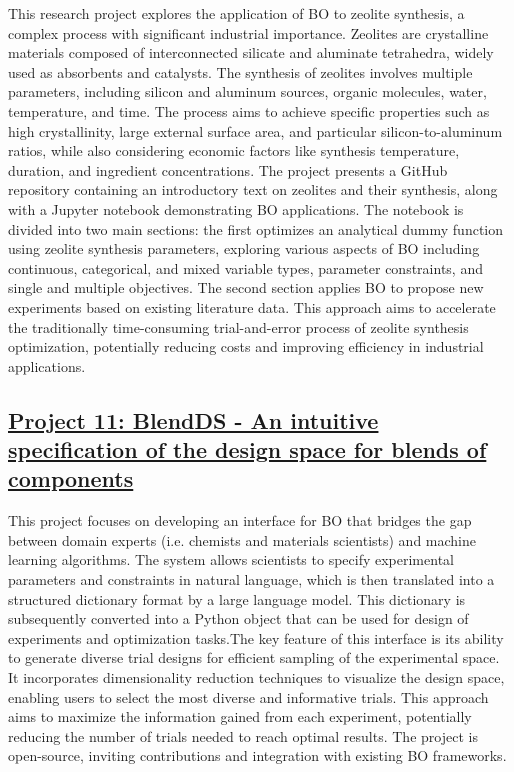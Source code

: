 This research project explores the application of BO to zeolite synthesis, a complex process with significant industrial importance. Zeolites are crystalline materials composed of interconnected silicate and aluminate tetrahedra, widely used as absorbents and catalysts\cite{dusselier2018small}. The synthesis of zeolites involves multiple parameters, including silicon and aluminum sources, organic molecules, water, temperature, and time. The process aims to achieve specific properties such as high crystallinity, large external surface area, and particular silicon-to-aluminum ratios, while also considering economic factors like synthesis temperature, duration, and ingredient concentrations\cite{mallette2024current}. The project presents a GitHub repository containing an introductory text on zeolites and their synthesis, along with a Jupyter notebook demonstrating BO applications. The notebook is divided into two main sections: the first optimizes an analytical dummy function using zeolite synthesis parameters, exploring various aspects of BO including continuous, categorical, and mixed variable types, parameter constraints, and single and multiple objectives. The second section applies BO to propose new experiments based on existing literature data. This approach aims to accelerate the traditionally time-consuming trial-and-error process of zeolite synthesis optimization, potentially reducing costs and improving efficiency in industrial applications.
 \subsection*{\href{https://www.youtube.com/watch?v=HASa3tFLZoI}{Project 11: BlendDS - An intuitive specification of the design space for blends of components}}

This project focuses on developing an interface for BO that bridges the gap between domain experts (i.e. chemists and materials scientists) and machine learning algorithms. The system allows scientists to specify experimental parameters and constraints in natural language, which is then translated into a structured dictionary format by a large language model. This dictionary is subsequently converted into a Python object that can be used for design of experiments and optimization tasks.The key feature of this interface is its ability to generate diverse trial designs for efficient sampling of the experimental space. It incorporates dimensionality reduction techniques to visualize the design space, enabling users to select the most diverse and informative trials. This approach aims to maximize the information gained from each experiment, potentially reducing the number of trials needed to reach optimal results. The project is open-source, inviting contributions and integration with existing BO frameworks.
